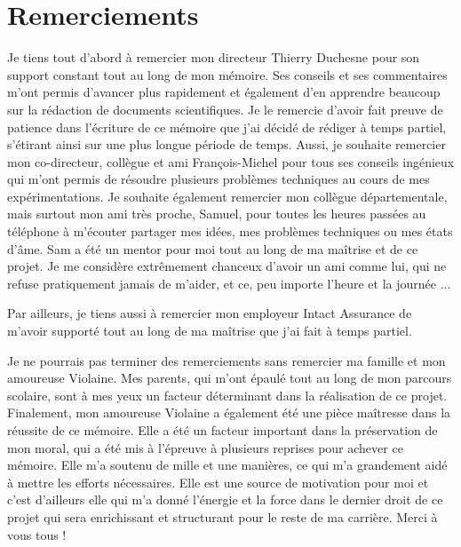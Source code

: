 \chapter*{Remerciements}        %
\label{chap:remerciements}      %

Je tiens tout d'abord à remercier mon directeur Thierry Duchesne pour son support constant tout au long de mon mémoire. Ses conseils et ses commentaires m'ont permis d'avancer plus rapidement et également d'en apprendre beaucoup sur la rédaction de documents scientifiques. Je le remercie d'avoir fait preuve de patience dans l'écriture de ce mémoire que j'ai décidé de rédiger à temps partiel, s'étirant ainsi sur une plus longue période de temps. Aussi, je souhaite remercier mon co-directeur, collègue et ami François-Michel pour tous ses conseils ingénieux qui m'ont permis de résoudre plusieurs problèmes techniques au cours de mes expérimentations. Je souhaite également remercier mon collègue départementale, mais surtout mon ami très proche, Samuel, pour toutes les heures passées au téléphone à m'écouter partager mes idées, mes problèmes techniques ou mes états d'âme. Sam a été un mentor pour moi tout au long de ma maîtrise et de ce projet. Je me considère extrêmement chanceux d'avoir un ami comme lui, qui ne refuse pratiquement jamais de m'aider, et ce, peu importe l'heure et la journée ... 

Par ailleurs, je tiens aussi à remercier mon employeur Intact Assurance de m'avoir supporté tout au long de ma maîtrise que j'ai fait à temps partiel.

Je ne pourrais pas terminer des remerciements sans remercier ma famille et mon amoureuse Violaine. Mes parents, qui m'ont épaulé tout au long de mon parcours scolaire, sont à mes yeux un facteur déterminant dans la réalisation de ce projet. Finalement, mon amoureuse Violaine a également été une pièce maîtresse dans la réussite de ce mémoire. Elle a été un facteur important dans la préservation de mon moral, qui a été mis à l'épreuve à plusieurs reprises pour achever ce mémoire. Elle m'a soutenu de mille et une manières, ce qui m'a grandement aidé à mettre les efforts nécessaires. Elle est une source de motivation pour moi et c'est d'ailleurs elle qui m'a donné l'énergie et la force dans le dernier droit de ce projet qui sera enrichissant et structurant pour le reste de ma carrière. Merci à vous tous ! 

